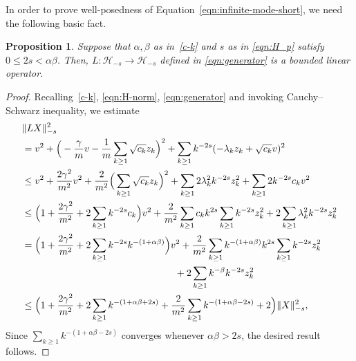 \documentclass[11pt]{amsart}
\theoremstyle{definition}
\renewcommand{\H}{\mathcal{H}}
\theoremstyle{definition}
\theoremstyle{plain}
\newtheorem{proposition}[theorem]{Proposition}
\numberwithin{equation}{section}
\begin{document}
In order to prove well-posedness of Equation~\eqref{eqn:infinite-mode-short}, we need the following basic fact.  
\begin{proposition} \label{prop:L:bounded} Suppose that $\alpha, \beta$ as in~\eqref{c-k} and $s$ as in \eqref{eqn:H_p} satisfy $0\leq 2s<\alpha\beta$. Then, $L:\H_{-s}\to \H_{-s}$ defined in \eqref{eqn:generator} is a bounded linear operator.
\end{proposition}
\begin{proof} Recalling~\eqref{c-k}, \eqref{eqn:H-norm}, \eqref{eqn:generator} and invoking Cauchy–Schwarz inequality, we estimate
\begin{equation*}
\begin{aligned}
\MoveEqLeft[0]\|LX\|_{-s}^2\\
& =  v^2+\Big(-\frac{\gamma}{m} v-\frac{1}{m}\sum_{k\geq 1} \sqrt{c_k} z_k\Big)^2+\sum_{k\geq 1}k^{-2s}(-\lambda_k z_k+\sqrt{c_k}v)^2\\
&\leq v^2+\frac{2\gamma^2}{m^2}v^2+\frac{2}{m^2}\Big(\sum_{k\geq 1} \sqrt{c_k} z_k\Big)^2+\sum_{k\geq 1}2\lambda_k^2k^{-2s}z_k^2+\sum_{k\geq 1}2k^{-2s}c_k v^2\\
&\leq \Big(1+\frac{2\gamma^2}{m^2}+2\sum_{k\geq 1}k^{-2s}c_k\Big)v^2+ \frac{2}{m^2}\sum_{k\geq 1}c_k k^{2s}\sum_{k\geq 1}k^{-2s} z_k^2+2\sum_{k\geq 1}\lambda_k^2 k^{-2s}z_k^2 \\
&=\Big(1+\frac{2\gamma^2}{m^2}+2\sum_{k\geq 1}k^{-2s}k^{-(1+\alpha\beta)}\Big)v^2+ \frac{2}{m^2}\sum_{k\geq 1}k^{-(1+\alpha\beta)} k^{2s}\sum_{k\geq 1}k^{-2s} z_k^2\\
&\qquad\qquad\qquad\qquad\qquad\qquad\qquad\qquad\!+2\sum_{k\geq 1}k^{-\beta} k^{-2s}z_k^2 \\
&\leq \Big(1+\frac{2\gamma^2}{m^2}+2\sum_{k\geq 1}k^{-(1+\alpha\beta+2s)}+\frac{2}{m^2}\sum_{k\geq 1}k^{-(1+\alpha\beta-2s)}+2\Big)\|X\|_{-s}^2,
\end{aligned}
\end{equation*}
Since $\sum_{k\geq 1}k^{-(1+\alpha\beta-2s)}$ converges whenever $\alpha\beta>2s$, the desired result follows.
\end{proof}
\end{document}
